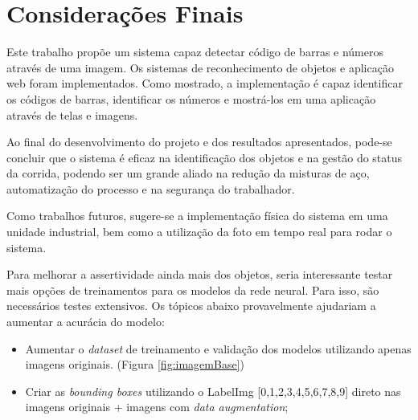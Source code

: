 \chapter{Considerações Finais}

 Este trabalho propõe um sistema capaz detectar código de barras e números através de uma imagem. Os sistemas de reconhecimento de objetos e aplicação web foram implementados. Como mostrado, a implementação é capaz identificar os códigos de barras, identificar os números e mostrá-los em uma aplicação através de telas e imagens.
 
Ao final do desenvolvimento do projeto e dos resultados apresentados, pode-se concluir que o sistema é eficaz na identificação dos objetos e na gestão do status da corrida, podendo ser um grande aliado na redução da misturas de aço, automatização do processo e na segurança do trabalhador.

Como trabalhos futuros, sugere-se a implementação física do sistema em uma unidade industrial, bem como a utilização da foto em tempo real para rodar o sistema. 

Para melhorar a assertividade ainda mais dos objetos, seria interessante testar mais opções de treinamentos para os modelos da rede neural. Para isso, são necessários testes extensivos. Os tópicos abaixo provavelmente ajudariam a aumentar a acurácia do modelo:

\begin{itemize}
    \item Aumentar o \textit{dataset} de treinamento e validação dos modelos utilizando apenas imagens originais. (Figura \ref{fig:imagemBase})
    \item Criar as \textit{bounding boxes} utilizando o LabelImg [0,1,2,3,4,5,6,7,8,9] direto nas imagens originais + imagens com \textit{data augmentation};
\end{itemize}
